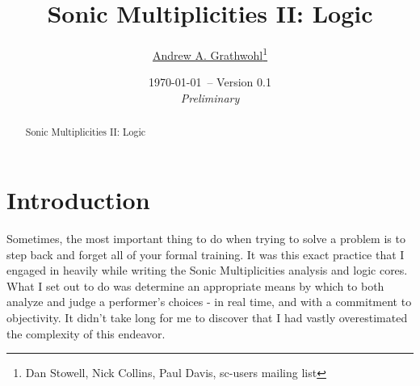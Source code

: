 \documentclass[12pt,twoside]{article}
\begin{document}



\begin{spacing}{0.9}
\begin{titlepage}

\title{Sonic Multiplicities II: Logic}

\author{\large \href{http://about.me/agrathwohl}{Andrew A. Grathwohl}\thanks{Dan Stowell, Nick Collins, Paul Davis, sc-users mailing list}\\ {}
   }

\date{\small \today \ -- Version 0.1\\ {\it Preliminary}}
\maketitle
\thispagestyle{empty}

\vspace{-0.3in}

\begin{abstract}
   Sonic Multiplicities II: Logic
\end{abstract}

\end{titlepage}
\end{spacing}


\section{Introduction}

Sometimes, the most important thing to do when trying to solve a problem is to step back and forget all of your formal training. It was this exact practice that I engaged in heavily while writing the Sonic Multiplicities analysis and logic cores. What I set out to do was determine an appropriate means by which to both analyze and judge a performer's choices - in real time, and with a commitment to objectivity. It didn't take long for me to discover that I had vastly overestimated the complexity of this endeavor.

\end{document}
